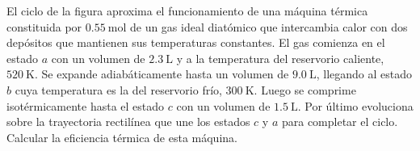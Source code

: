 \documentclass[a4paper,11pt,dvipsnames]{article}
\begin{document}
\begin{enumerate}[leftmargin=*]
  \begin{minipage}[t]{.5\textwidth}
  \item El ciclo de la figura aproxima el funcionamiento de una máquina térmica constituida por $\SI{0.55}{\mole}$ de un gas ideal diatómico que intercambia calor con dos depósitos que mantienen sus temperaturas constantes. El gas comienza en el estado $a$ con un volumen de $\SI{2.3}{\liter}$ y a la temperatura del reservorio caliente, $\SI{520}{\kelvin}$. Se expande adiabáticamente hasta un volumen de $\SI{9.0}{\liter}$, llegando al estado $b$ cuya temperatura es la del reservorio frío, $\SI{300}{\kelvin}$. Luego se comprime isotérmicamente hasta el estado $c$ con un volumen de $\SI{1.5}{\liter}$. Por último evoluciona sobre la trayectoria rectilínea que une los estados $c$ y $a$ para completar el ciclo. Calcular la eficiencia térmica de esta máquina. 
    \end{minipage}
  \hspace{0.02\linewidth}
  \begin{minipage}[t]{.4\textwidth}
    \strut\vspace*{-\baselineskip}\newline
  \begin{center}
  \end{center}
\end{minipage}
  
\end{enumerate}
\end{document}
